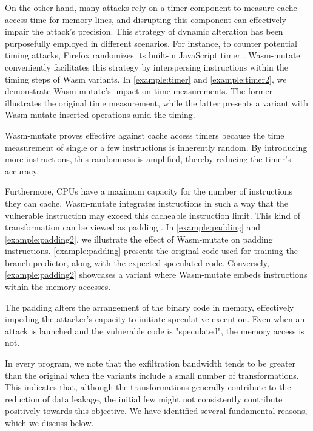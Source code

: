 \documentclass[sigplan,screen]{acmart}
\newcommand*\badge[1]{ \colorbox{red}{\color{white}#1}}
\newcommand{\tool}{Wasm-mutate\xspace}
\newcommand{\wasm}{Wasm\xspace}
\newcommand{\todo}[1]{%
\refstepcounter{todo}
\noindent\textbf{\badge{TODO}} {\color{red}#1}
\addcontentsline{td}{todo}
{\color{red}\thesection.\thetodo\xspace #1}}
\begin{document}
On the other hand, many attacks rely on a timer component to measure cache access time for memory lines, and disrupting this component can effectively impair the attack's precision. 
This strategy of dynamic alteration has been purposefully employed in different scenarios. 
For instance, to counter potential timing attacks, Firefox randomizes its built-in JavaScript timer \cite{10.1007/978-3-319-70972-7_13}. \tool conveniently facilitates this strategy by interspersing instructions within the timing steps of \wasm variants. 
In \autoref{example:timer} and \autoref{example:timer2}, we demonstrate \tool's impact on time measurements. 
The former illustrates the original time measurement, while the latter presents a variant with \tool-inserted operations amid the timing.



\tool proves effective against cache access timers because the time measurement of single or a few instructions is inherently random. 
By introducing more instructions, this randomness is amplified, thereby reducing the timer's accuracy.

Furthermore, CPUs have a maximum capacity for the number of instructions they can cache.
\tool integrates instructions in such a way that the vulnerable instruction may exceed this cacheable instruction limit.
This kind of transformation can be viewed as padding \cite{padding}.
In \autoref{example:padding} and \autoref{example:padding2}, we illustrate the effect of \tool on padding instructions.
\autoref{example:padding} presents the original code used for training the branch predictor, along with the expected speculated code.
Conversely, \autoref{example:padding2} showcases a variant where \tool embeds instructions within the memory accesses.



The padding alters the arrangement of the binary code in memory, effectively impeding the attacker's capacity to initiate speculative execution.
Even when an attack is launched and the vulnerable code is "speculated", the memory access is not.


In every program, we note that the exfiltration bandwidth tends to be greater than the original when the variants include a small number of transformations.
This indicates that, although the transformations generally contribute to the reduction of data leakage, the initial few might not consistently contribute positively towards this objective.
We have identified several fundamental reasons, which we discuss below.
\end{document}
